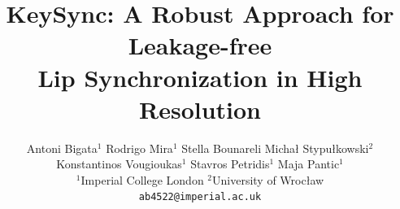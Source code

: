 \documentclass[10pt,twocolumn,letterpaper]{article}
\title{KeySync: A Robust Approach for Leakage-free \\ Lip Synchronization in High Resolution}
\author{Antoni Bigata$^{1}$ \qquad  \qquad Rodrigo Mira$^{1}$ \qquad Stella Bounareli \qquad Michał Stypułkowski$^{2}$ \\
Konstantinos Vougioukas$^{1}$ \qquad Stavros Petridis$^{1}$ \qquad Maja Pantic$^{1}$ \vspace{.2cm} \\
$^{1}$Imperial College London \qquad $^{2}$University of Wrocław \\
{\tt\small ab4522@imperial.ac.uk}
}
\begin{document}
\maketitle
    







{
    \small
    
    
}

\end{document}
